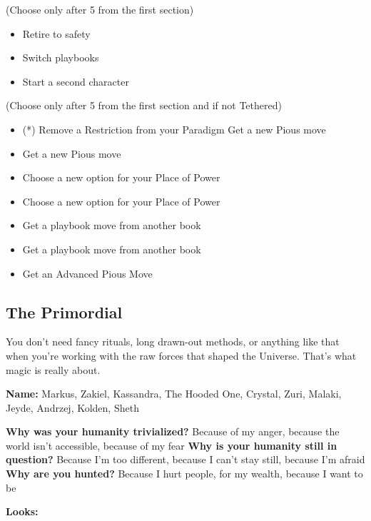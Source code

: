 \documentclass[
]{article}
\providecommand{\tightlist}{%
  \setlength{\itemsep}{0pt}\setlength{\parskip}{0pt}}
\begin{document}
(Choose only after 5 from the first section)

\begin{itemize}
\tightlist
\item
  Retire to safety
\item
  Switch playbooks
\item
  Start a second character
\end{itemize}

(Choose only after 5 from the first section and if not Tethered)

\begin{itemize}
\tightlist
\item
  (*) Remove a Restriction from your Paradigm Get a new Pious move
\item
  Get a new Pious move
\item
  Choose a new option for your Place of Power
\item
  Choose a new option for your Place of Power
\item
  Get a playbook move from another book
\item
  Get a playbook move from another book
\item
  Get an Advanced Pious Move
\end{itemize}

\newpage

\hypertarget{the-primordial}{%
\subsection{The Primordial}\label{the-primordial}}

You don't need fancy rituals, long drawn-out methods, or anything like
that when you're working with the raw forces that shaped the Universe.
That's what magic is really about.

\textbf{Name:} Markus, Zakiel, Kassandra, The Hooded One, Crystal, Zuri,
Malaki, Jeyde, Andrzej, Kolden, Sheth

\textbf{Why was your humanity trivialized?} Because of my anger, because
the world isn't accessible, because of my fear \textbf{Why is your
humanity still in question?} Because I'm too different, because I can't
stay still, because I'm afraid\\
\textbf{Why are you hunted?} Because I hurt people, for my wealth,
because I want to be

\textbf{Looks:}
\end{document}
